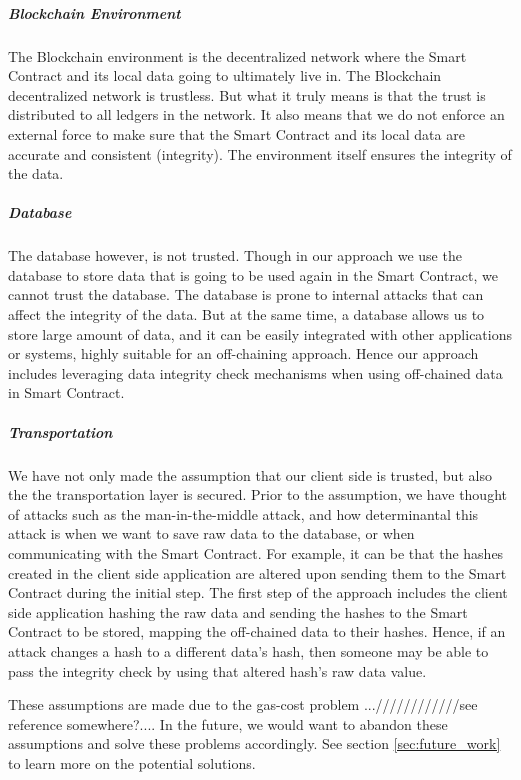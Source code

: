 \subparagraph{Blockchain Environment}
The Blockchain environment is the decentralized network where the Smart Contract and its local data going to ultimately live in. The Blockchain decentralized network is trustless. But what it truly means is that the trust is distributed to all ledgers in the network. It also means that we do not enforce an external force to make sure that the Smart Contract and its local data are accurate and consistent (integrity). The environment itself ensures the integrity of the data. 

\subparagraph{Database}
The database however, is not trusted. Though in our approach we use the database to store data that is going to be used again in the Smart Contract, we cannot trust the database. The database is prone to internal attacks that can affect the integrity of the data. But at the same time, a database allows us to store large amount of data, and it can be easily integrated with other applications or systems, highly suitable for an off-chaining approach. Hence our approach includes leveraging data integrity check mechanisms when using off-chained data in Smart Contract.

\subparagraph{Transportation}
We have not only made the assumption that our client side is trusted, but also the the transportation layer is secured. Prior to the assumption, we have thought of attacks such as the man-in-the-middle attack, and how determinantal this attack is when we want to save raw data to the database, or when communicating with the Smart Contract. For example, it can be that the hashes created in the client side application are altered upon sending them to the Smart Contract during the initial step. The first step of the approach includes the client side application hashing the raw data and sending the hashes to the Smart Contract to be stored, mapping the off-chained data to their hashes. Hence, if an attack changes a hash to a different data’s hash, then someone may be able to pass the integrity check by using that altered hash’s raw data value. 

These assumptions are made due to the gas-cost problem ...////////////see reference somewhere?.... In the future, we would want to abandon these assumptions and solve these problems accordingly. See section \ref{sec:future_work} to learn more on the potential solutions.
